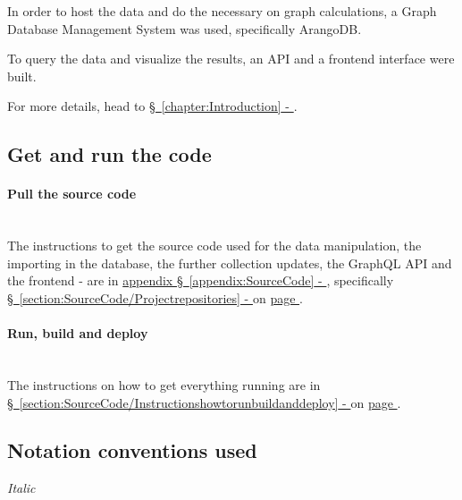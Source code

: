 In order to host the data and do the necessary on graph calculations, a Graph Database Management System was used, specifically ArangoDB.

To query the data and visualize the results, an \acrshort{API} and a \gls{frontend} interface were built.

For more details, head to \hyperref[chapter:Introduction]{\S\ \ref{chapter:Introduction} - }.

\subsection{Get and run the code} \label{subsection:Preface/Aboutthisthesis/Getandrunthecode}
\paragraph{Pull the source code}\mbox{}\\\indent
The instructions to get the source code used for the \gls{data manipulation}, the \gls{import}ing in the database, the further collection updates, the \gls{GraphQL} \acrshort{API} and the frontend - are in \hyperref[appendix:SourceCode]{appendix \S\ \ref{appendix:SourceCode} - }, specifically \hyperref[section:SourceCode/Projectrepositories]{\S\ \ref{section:SourceCode/Projectrepositories} - } on \hyperref[section:SourceCode/Projectrepositories]{page \pageref{section:SourceCode/Projectrepositories}}.
\par
\paragraph{Run, build and deploy}\mbox{}\\\indent
The instructions on how to get everything running are in \hyperref[section:SourceCode/Instructionshowtorunbuildanddeploy]{\S\ \ref{section:SourceCode/Instructionshowtorunbuildanddeploy} - } on \hyperref[section:SourceCode/Instructionshowtorunbuildanddeploy]{page \pageref{section:SourceCode/Instructionshowtorunbuildanddeploy}}.
\par

\subsection{Notation conventions used} \label{subsection:Preface/Aboutthisthesis/Notationconventionsused}
\noindent\textit{Italic}

